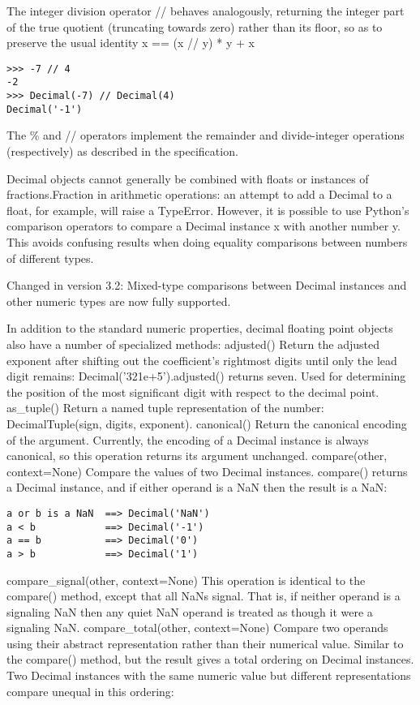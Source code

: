 The integer division operator // behaves analogously, returning the integer part of the true quotient (truncating towards zero) rather than its floor, so as to preserve the usual identity x == (x // y) * y + x %

\begin{lstlisting}
>>> -7 // 4
-2
>>> Decimal(-7) // Decimal(4)
Decimal('-1')
\end{lstlisting}

The \% and // operators implement the remainder and divide-integer operations (respectively) as described in the specification.

Decimal objects cannot generally be combined with floats or instances of fractions.Fraction in arithmetic operations: an attempt to add a Decimal to a float, for example, will raise a TypeError. However, it is possible to use Python’s comparison operators to compare a Decimal instance x with another number y. This avoids confusing results when doing equality comparisons between numbers of different types.


Changed in version 3.2: Mixed-type comparisons between Decimal instances and other numeric types are now fully supported.

In addition to the standard numeric properties, decimal floating point objects also have a number of specialized methods:
adjusted()
Return the adjusted exponent after shifting out the coefficient’s rightmost digits until only the lead digit remains: Decimal('321e+5').adjusted() returns seven. Used for determining the position of the most significant digit with respect to the decimal point.
as\_tuple()
Return a named tuple representation of the number: DecimalTuple(sign, digits, exponent).
canonical()
Return the canonical encoding of the argument. Currently, the encoding of a Decimal instance is always canonical, so this operation returns its argument unchanged.
compare(other, context=None)
Compare the values of two Decimal instances. compare() returns a Decimal instance, and if either operand is a NaN then the result is a NaN:

\begin{lstlisting}
a or b is a NaN  ==> Decimal('NaN')
a < b            ==> Decimal('-1')
a == b           ==> Decimal('0')
a > b            ==> Decimal('1')
\end{lstlisting}

compare\_signal(other, context=None)
This operation is identical to the compare() method, except that all NaNs signal. That is, if neither operand is a signaling NaN then any quiet NaN operand is treated as though it were a signaling NaN.
compare\_total(other, context=None)
Compare two operands using their abstract representation rather than their numerical value. Similar to the compare() method, but the result gives a total ordering on Decimal instances. Two Decimal instances with the same numeric value but different representations compare unequal in this ordering:

